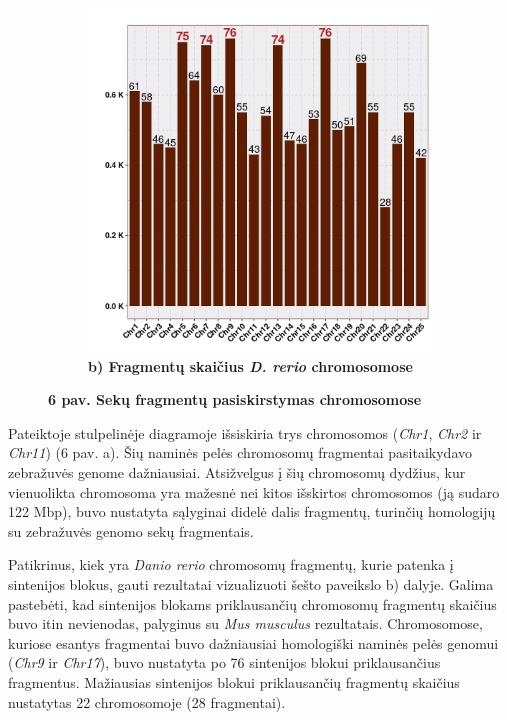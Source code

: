 \documentclass[12pt]{article}
\begin{document}
\begin{figure}[htb]
\begin{subfigure}[b]{0.45\textwidth}
        \includegraphics[width=\textwidth]{../Figures/Synteny_Chr_DR.png}
        \caption*{\centering\small\textbf{b) Fragmentų skaičius \emph{D. rerio}
                                          chromosomose}}
    \end{subfigure}
    \caption*{\small\textbf{6 pav. Sekų fragmentų pasiskirstymas chromosomose}}
    \label{fig:6}
\end{figure}

Pateiktoje stulpelinėje diagramoje išsiskiria trys chromosomos (\emph{Chr1},
\emph{Chr2} ir \emph{Chr11}) (6 pav. a). Šių naminės pelės chromosomų
fragmentai pasitaikydavo zebražuvės genome dažniausiai. Atsižvelgus į šių
chromosomų dydžius, kur vienuolikta chromosoma yra mažesnė nei kitos išskirtos
chromosomos (ją sudaro 122 Mbp\cite{MGI}), buvo nustatyta sąlyginai didelė dalis
fragmentų, turinčių homologijų su zebražuvės genomo sekų fragmentais.

Patikrinus, kiek yra \emph{Danio rerio} chromosomų fragmentų, kurie patenka į
sintenijos blokus, gauti rezultatai vizualizuoti šešto paveikslo b) dalyje.
Galima pastebėti, kad sintenijos blokams priklausančių chromosomų fragmentų
skaičius buvo itin nevienodas, palyginus su \emph{Mus musculus} rezultatais.
Chromosomose, kuriose esantys fragmentai buvo dažniausiai homologiški naminės
pelės genomui (\emph{Chr9} ir \emph{Chr17}), buvo nustatyta po 76 sintenijos
blokui priklausančius fragmentus. Mažiausias sintenijos blokui priklausančių
fragmentų skaičius nustatytas 22 chromosomoje (28 fragmentai).
\end{document}
